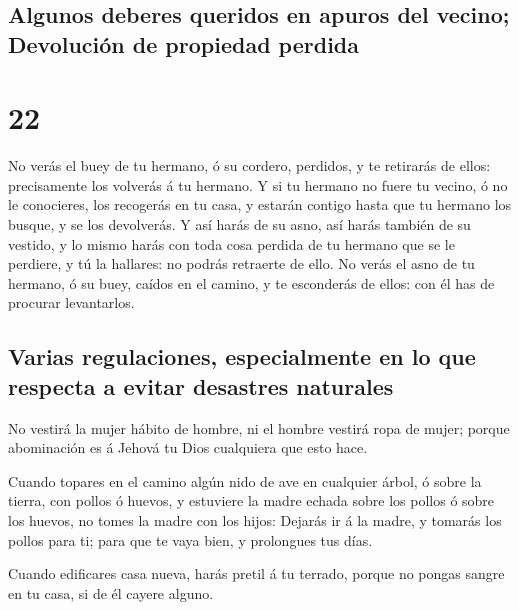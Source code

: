 \hypertarget{algunos-deberes-queridos-en-apuros-del-vecino-devoluciuxf3n-de-propiedad-perdida}{%
\subsection{Algunos deberes queridos en apuros del vecino; Devolución de
propiedad
perdida}\label{algunos-deberes-queridos-en-apuros-del-vecino-devoluciuxf3n-de-propiedad-perdida}}

\hypertarget{section-05-22}{%
\section{22}\label{section-05-22}}

 No verás el buey de tu hermano, ó su cordero, perdidos, y
te retirarás de ellos: precisamente los volverás á tu hermano.
 Y si tu hermano no fuere tu vecino, ó no le conocieres,
los recogerás en tu casa, y estarán contigo hasta que tu hermano los
busque, y se los devolverás.  Y así harás de su asno, así
harás también de su vestido, y lo mismo harás con toda cosa perdida de
tu hermano que se le perdiere, y tú la hallares: no podrás retraerte de
ello.  No verás el asno de tu hermano, ó su buey, caídos
en el camino, y te esconderás de ellos: con él has de procurar
levantarlos.

\hypertarget{varias-regulaciones-especialmente-en-lo-que-respecta-a-evitar-desastres-naturales}{%
\subsection{Varias regulaciones, especialmente en lo que respecta a
evitar desastres
naturales}\label{varias-regulaciones-especialmente-en-lo-que-respecta-a-evitar-desastres-naturales}}

 No vestirá la mujer hábito de hombre, ni el hombre
vestirá ropa de mujer; porque abominación es á Jehová tu Dios cualquiera
que esto hace.

 Cuando topares en el camino algún nido de ave en
cualquier árbol, ó sobre la tierra, con pollos ó huevos, y estuviere la
madre echada sobre los pollos ó sobre los huevos, no tomes la madre con
los hijos:  Dejarás ir á la madre, y tomarás los pollos
para ti; para que te vaya bien, y prolongues tus días.

 Cuando edificares casa nueva, harás pretil á tu terrado,
porque no pongas sangre en tu casa, si de él cayere alguno.

